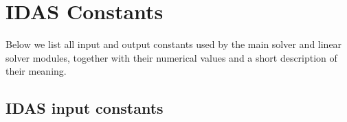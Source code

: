 \chapter{IDAS Constants}\label{c:constants}

Below we list all input and output constants used by the main solver and 
linear solver modules, together with their numerical values and a short
description of their meaning.


\newlength{\tcolone}
\newlength{\tcoltwo}
\settowidth{\tcoltwo}{-20}
\newlength{\tcolthree}
\setlength{\tcolthree}{\textwidth}
\addtolength{\tcolthree}{-0.5in}
\addtolength{\tcolthree}{-\tcolone}
\addtolength{\tcolthree}{-\tcoltwo}

\tablefirsthead{}
\tablehead{}
\tabletail{}
\tablelasttail{}


\section{IDAS input constants}\label{s:ida_in_constants}

